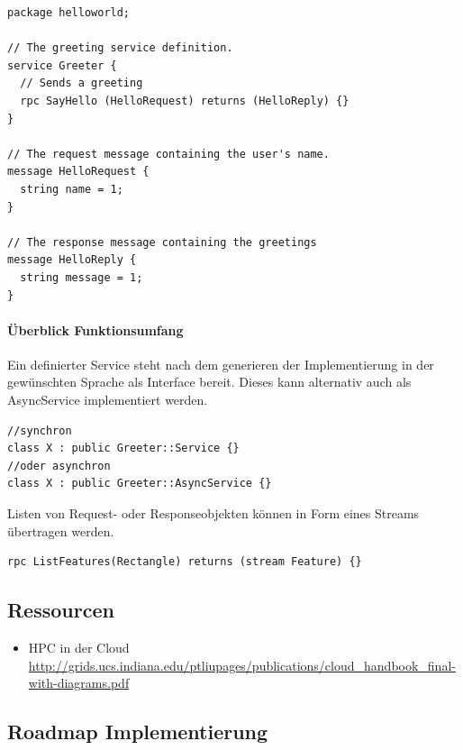\documentclass[a4paper,10pt]{article}
\numberwithin{figure}{section}
\numberwithin{table}{section}
\begin{document}
\begin{lstlisting}[frame=single,caption=Beispiel grpc, breaklines=true]
package helloworld;

// The greeting service definition.
service Greeter {
  // Sends a greeting
  rpc SayHello (HelloRequest) returns (HelloReply) {}
}

// The request message containing the user's name.
message HelloRequest {
  string name = 1;
}

// The response message containing the greetings
message HelloReply {
  string message = 1;
}
\end{lstlisting}

\paragraph{Überblick Funktionsumfang}

Ein definierter Service steht nach dem generieren der Implementierung in der gewünschten Sprache als Interface bereit.
Dieses kann alternativ auch als AsyncService implementiert werden.

\begin{lstlisting}[frame=single,caption=grpc Service Definition, breaklines=true]
//synchron
class X : public Greeter::Service {}
//oder asynchron
class X : public Greeter::AsyncService {}
\end{lstlisting}

Listen von Request- oder Responseobjekten können in Form eines Streams übertragen werden.

\begin{lstlisting}[frame=single,caption=grpc Funktion Definition, breaklines=true]
rpc ListFeatures(Rectangle) returns (stream Feature) {}
\end{lstlisting}

\subsection{Ressourcen}

\begin{itemize}
 \item HPC in der Cloud \url{http://grids.ucs.indiana.edu/ptliupages/publications/cloud_handbook_final-with-diagrams.pdf}
\end{itemize}

\subsection{Roadmap Implementierung}
\end{document}
